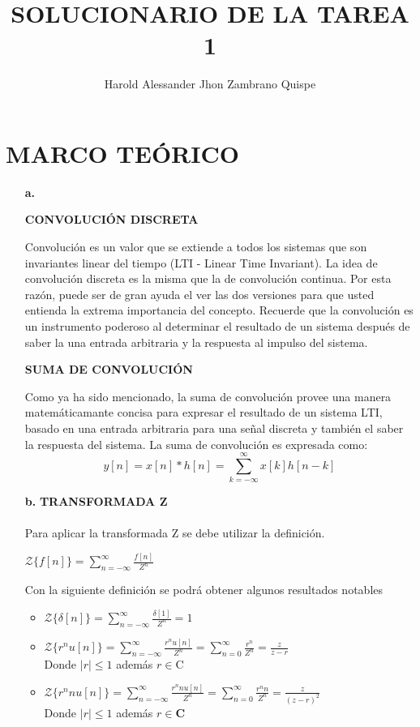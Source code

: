 \documentclass[11pt,a4paper]{article}
\author{Harold Alessander Jhon Zambrano Quispe}
\title{SOLUCIONARIO DE LA TAREA 1}
\begin{document}
   
   
   \section{{MARCO TEÓRICO}}{
	\large{
	\begin{enumerate}
	\item[\textbf{a.}]
	\begin{flushleft}
\textbf{CONVOLUCIÓN DISCRETA}
\end{flushleft}
Convolución es un valor que se extiende a todos los sistemas que son invariantes linear del tiempo (LTI - Linear Time Invariant). La idea de convolución discreta es la misma que la de convolución continua. Por esta razón, puede ser de gran ayuda el ver las dos versiones para que usted entienda la extrema importancia del concepto. Recuerde que la convolución es un instrumento poderoso al determinar el resultado de un sistema después de saber la una entrada arbitraria y la respuesta al impulso del sistema. 
\begin{flushleft}
\textbf{SUMA DE CONVOLUCIÓN}
\end{flushleft}
Como ya ha sido mencionado, la suma de convolución provee una manera matemáticamante concisa para expresar el resultado de un sistema LTI, basado en una entrada arbitraria para una señal discreta y también el saber la respuesta del sistema. La suma de convolución es expresada como:
$$\boxed{y[n]=x[n]*h[n]=\sum_{k=-\infty}^{\infty}x[k]h[n-k]}$$

	\item[\textbf{b.}]
	\textbf{TRANSFORMADA Z}\\\\
	Para aplicar la transformada Z se debe utilizar la definición.

\begin{center}
$\boxed{\mathcal{Z}\{f[n]\}=\sum_{n=-\infty}^{\infty}\frac{f[n]}{Z^n}}$
\end{center}

Con la siguiente definición se podrá obtener algunos resultados notables

\begin{itemize}

    \item $\mathcal{Z}\{\delta[n]\}=\sum_{n=-\infty}^{\infty}\frac{\delta[1]}{Z^n}=1$\\
    \item $\mathcal{Z}\{r^nu[n]\}=\sum_{n=-\infty}^{\infty}\frac{r^nu[n]}{Z^n}=\sum_{n=0}^{\infty}\frac{r^n}{Z^n}=\frac{z}{z-r}$\\
    Donde $|r|\leq1$ además $r\in\mathrm{C}$\\
    \item $\mathcal{Z}\{r^nnu[n]\}=\sum_{n=-\infty}^{\infty}\frac{r^nnu[n]}{Z^n}=\sum_{n=0}^{\infty}\frac{r^nn}{Z^n}=\frac{z}{(z-r)^2}$\\
    Donde $|r|\leq1$ además $r\in\mathbf{C}$\\
    

\end{itemize}
\end{enumerate}}}
\end{document}
